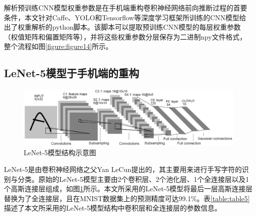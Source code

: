解析预训练CNN模型权重参数是在手机端重构卷积神经网络前向推断过程的首要条件，本文针对Caffe、YOLO和Tensorflow等深度学习框架所训练的CNN模型给出了权重解析的python脚本。该脚本可以提取预训练CNN模型的每层权重参数（权值矩阵和偏置矩阵等），并将这些权重参数分层保存为二进制npy文件格式，整个流程如图\ref{figure:figure14}所示。

\subsection{LeNet-5模型于手机端的重构}

\begin{figure}[htbp]
    \centering
    \includegraphics[width=1.0\textwidth]{figures/lenet.pdf}
    \caption{LeNet-5模型结构示意图 \cite{lecun1998gradient}}\label{figure:figure15}
\end{figure}

LeNet-5是由卷积神经网络之父Yan LeCun提出的，其主要用来进行手写字符的识别与分类。原始的LeNet-5模型主要由2个卷积层、2个池化层、1个全连接层以及1个高斯连接层组成，如图\ref{figure:figure15}所示。本文所采用的LeNet-5模型将最后一层高斯连接层替换为了全连接层，且在MNIST数据集\cite{lecun.com}上的预测精度可达99.1\%。表\ref{table:table5}描述了本文所采用的LeNet-5模型结构中卷积层和全连接层的参数信息。
\vspace{-1.5em}
\begin{table}[htbp]
  \centering
  \caption{LeNet-5模型结构中的卷积层和全连接层}
  \label{table:table5}
\end{table}
\vspace{-0.5em}


